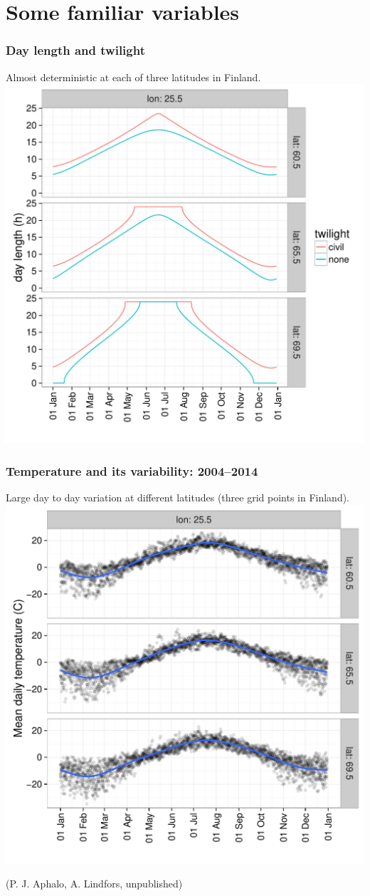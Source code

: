 \documentclass[10pt]{beamer}\usepackage[]{graphicx}\usepackage[]{color}
\begin{document}
\section{Some familiar variables}

\begin{frame}
  \frametitle{Day length and twilight}
  Almost deterministic at each of three latitudes in Finland.\\[0.5ex]
  \centering
  \includegraphics[width=0.6\linewidth]{figures/fig-anders4.pdf}
\end{frame}

\begin{frame}
  \frametitle{Temperature and its variability: 2004--2014}
  Large day to day variation at different latitudes (three grid points in Finland).\\
  \centering
  \includegraphics[width=0.6\linewidth]{figures/fig-anders2.pdf}

  (P. J. Aphalo, A. Lindfors, unpublished)
\end{frame}
\end{document}
